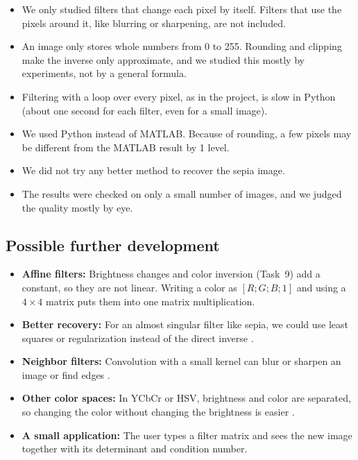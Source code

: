 \begin{itemize}
  \item We only studied filters that change each pixel by itself. Filters that use
    the pixels around it, like blurring or sharpening, are not included.
  \item An image only stores whole numbers from 0 to 255. Rounding and clipping
    make the inverse only approximate, and we studied this mostly by experiments,
    not by a general formula.
  \item Filtering with a loop over every pixel, as in the project, is slow in
    Python (about one second for each filter, even for a small image).
  \item We used Python instead of MATLAB. Because of rounding, a few pixels may be
    different from the MATLAB result by 1 level.
  \item We did not try any better method to recover the sepia image.
  \item The results were checked on only a small number of images, and we judged
    the quality mostly by eye.
\end{itemize}

\subsection{Possible further development}

\begin{itemize}
  \item \textbf{Affine filters:} Brightness changes and color inversion (Task~9)
    add a constant, so they are not linear. Writing a color as $[R;G;B;1]$ and
    using a $4 \times 4$ matrix puts them into one matrix multiplication.
  \item \textbf{Better recovery:} For an almost singular filter like sepia, we
    could use least squares or regularization instead of the direct inverse
    \cite{higham2002}.
  \item \textbf{Neighbor filters:} Convolution with a small kernel can blur or
    sharpen an image or find edges \cite{gonzalez2018}.
  \item \textbf{Other color spaces:} In YCbCr or HSV, brightness and color are
    separated, so changing the color without changing the brightness is easier
    \cite{gonzalez2018}.
  \item \textbf{A small application:} The user types a filter matrix and sees the
    new image together with its determinant and condition number.
\end{itemize}

